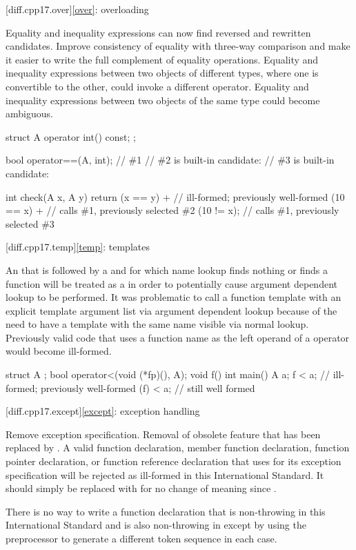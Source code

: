 [diff.cpp17.over]{\ref{over}: overloading}

\change
Equality and inequality expressions can now find
reversed and rewritten candidates.
\rationale
Improve consistency of equality with three-way comparison
and make it easier to write the full complement of equality operations.
\effect
Equality and inequality expressions between two objects of different types,
where one is convertible to the other,
could invoke a different operator.
Equality and inequality expressions between two objects of the same type
could become ambiguous.
\begin{codeblock}
struct A {
  operator int() const;
};

bool operator==(A, int);        // \#1
// \#2 is built-in candidate: 
// \#3 is built-in candidate: 

int check(A x, A y) {
  return (x == y) +             // ill-formed; previously well-formed
    (10 == x) +                 // calls \#1, previously selected \#2
    (10 != x);                  // calls \#1, previously selected \#3
}
\end{codeblock}

[diff.cpp17.temp]{\ref{temp}: templates}

\change
An 
that is followed by a \tcode{<}
and for which name lookup
finds nothing or finds a function
will be treated as a 
in order to potentially cause argument dependent lookup to be performed.
\rationale
It was problematic to call a function template
with an explicit template argument list
via argument dependent lookup
because of the need to have a template with the same name
visible via normal lookup.
\effect
Previously valid code that uses a function name
as the left operand of a \tcode{<} operator
would become ill-formed.
\begin{codeblock}
struct A {};
bool operator<(void (*fp)(), A);
void f() {}
int main() {
  A a;
  f < a;    // ill-formed; previously well-formed
  (f) < a;  // still well formed
}
\end{codeblock}

[diff.cpp17.except]{\ref{except}: exception handling}

\change
Remove  exception specification.
\rationale
Removal of obsolete feature that has been replaced by .
\effect
A valid \CppXVII{} function declaration, member function declaration, function
pointer declaration, or function reference declaration that uses 
for its exception specification will be rejected as ill-formed in this
International Standard. It should simply be replaced with  for no
change of meaning since \CppXVII{}.
\begin{note}
There is no way to write a function declaration
that is non-throwing in this International Standard
and is also non-throwing in \CppIII{}
except by using the preprocessor to generate
a different token sequence in each case.
\end{note}

